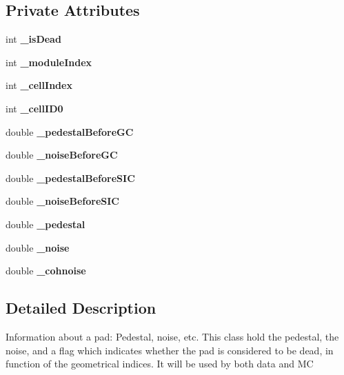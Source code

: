 \subsection*{Private Attributes}
\begin{DoxyCompactItemize}
\item 
int {\bfseries \_\-isDead}\label{classCALICE_1_1NoiseParameter_a03f4de43745541be50a09781b8e89839}

\item 
int {\bfseries \_\-moduleIndex}\label{classCALICE_1_1NoiseParameter_a6a940aaa8b66a7bc9eb0153733c42b86}

\item 
int {\bfseries \_\-cellIndex}\label{classCALICE_1_1NoiseParameter_a2c43ce031c49e48559f6aa01c6836012}

\item 
int {\bfseries \_\-cellID0}\label{classCALICE_1_1NoiseParameter_ad617a135ebfd7e49a17101d2911b06fc}

\item 
double {\bfseries \_\-pedestalBeforeGC}\label{classCALICE_1_1NoiseParameter_a84581448f67828307fda00d2cfd39c85}

\item 
double {\bfseries \_\-noiseBeforeGC}\label{classCALICE_1_1NoiseParameter_af097bce79566b82d2e920439cfd94cd1}

\item 
double {\bfseries \_\-pedestalBeforeSIC}\label{classCALICE_1_1NoiseParameter_af7aa0d50c9a7656f7e4965e9dabfa1bd}

\item 
double {\bfseries \_\-noiseBeforeSIC}\label{classCALICE_1_1NoiseParameter_ac554d0afad408a3aed8e3a521ee8c466}

\item 
double {\bfseries \_\-pedestal}\label{classCALICE_1_1NoiseParameter_a6b4a80837d89299a9319157aab127a28}

\item 
double {\bfseries \_\-noise}\label{classCALICE_1_1NoiseParameter_a48f6d0c4bc54f23e4e58df5da2bcc5f4}

\item 
double {\bfseries \_\-cohnoise}\label{classCALICE_1_1NoiseParameter_ae362643e5670037960a664be7d8c4635}

\end{DoxyCompactItemize}


\subsection{Detailed Description}
Information about a pad: Pedestal, noise, etc. This class hold the pedestal, the noise, and a flag which indicates whether the pad is considered to be dead, in function of the geometrical indices. It will be used by both data and MC 

